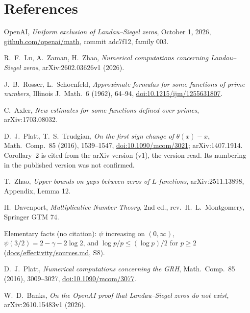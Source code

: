 \documentclass[11pt]{article}
\begin{document}
\section*{References}
\begin{enumerate}[label={[S\arabic*]}]
\item OpenAI, \emph{Uniform exclusion of Landau--Siegel zeros}, October 1, 2026, \url{github.com/openai/math}, commit adc7f12, family 003.
\item R.~F.~Lu, A.~Zaman, H.~Zhao, \emph{Numerical computations concerning Landau--Siegel zeros}, arXiv:2602.03626v1 (2026).
\item J.~B.~Rosser, L.~Schoenfeld, \emph{Approximate formulas for some functions of prime numbers}, Illinois J.\ Math.\ 6 (1962), 64--94, \url{doi:10.1215/ijm/1255631807}.
\item C.~Axler, \emph{New estimates for some functions defined over primes}, arXiv:1703.08032.
\item D.~J.~Platt, T.~S.~Trudgian, \emph{On the first sign change of $\theta(x)-x$}, Math.\ Comp.\ 85 (2016), 1539--1547, \url{doi:10.1090/mcom/3021}; arXiv:1407.1914. Corollary~2 is cited from the arXiv version (v1), the version read. Its numbering in the published version was not confirmed.
\item T.~Zhao, \emph{Upper bounds on gaps between zeros of $L$-functions}, arXiv:2511.13898, Appendix, Lemma 12.
\item H.~Davenport, \emph{Multiplicative Number Theory}, 2nd ed., rev.\ H.~L.~Montgomery, Springer GTM 74.
\item Elementary facts (no citation): $\psi$ increasing on $(0,\infty)$, $\psi(3/2)=2-\gamma-2\log2$, and $\log p/p\le(\log p)/2$ for $p\ge2$ (\url{docs/effectivity/sources.md}, S8).
\item D.~J.~Platt, \emph{Numerical computations concerning the GRH}, Math.\ Comp.\ 85 (2016), 3009--3027, \url{doi:10.1090/mcom/3077}.
\item W.~D.~Banks, \emph{On the OpenAI proof that Landau--Siegel zeros do not exist}, arXiv:2610.15483v1 (2026).\end{enumerate}
\end{document}
